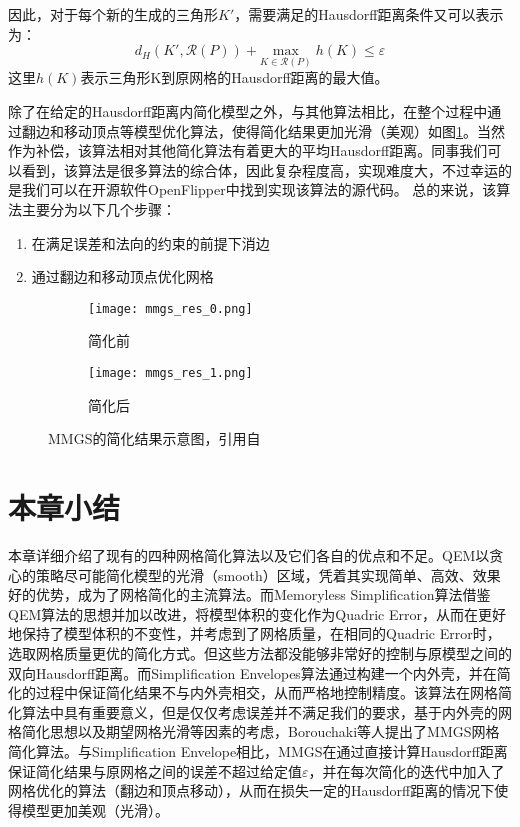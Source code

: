 因此，对于每个新的生成的三角形$K'$，需要满足的Hausdorff距离条件又可以表示为：
\begin{equation}
  d_H(K',\mathcal{R}(P))+\underset{K\in\mathcal{R}(P)}{\text{max}}\;h(K) \le \varepsilon
\end{equation}
这里$h(K)$表示三角形K到原网格的Hausdorff距离的最大值。\par
除了在给定的Hausdorff距离内简化模型之外，与其他算法相比，在整个过程中通过翻边和移动顶点等模型优化算法，使得简化结果更加光滑（美观）如图\ref{fig:mmgs-res}。当然作为补偿，该算法相对其他简化算法有着更大的平均Hausdorff距离。同事我们可以看到，该算法是很多算法的综合体，因此复杂程度高，实现难度大，不过幸运的是我们可以在开源软件OpenFlipper中找到实现该算法的源代码。
总的来说，该算法主要分为以下几个步骤：
\begin{enumerate}[（1）]
  \item 在满足误差和法向的约束的前提下消边
  \item 通过翻边和移动顶点优化网格
\end{enumerate}
\begin{figure}[htbp]
  \centering
  \begin{subfigure}[b]{0.4\textwidth}
    \texttt{[image: mmgs\_res\_0.png]}
    \caption[input]{简化前}
    \end{subfigure}
    \begin{subfigure}[b]{0.4\textwidth}
      \texttt{[image: mmgs\_res\_1.png]}
      \caption[mls]{简化后}
    \end{subfigure}
    \caption[Result]{MMGS的简化结果示意图，引用自\cite{mmgs}}
    \label{fig:mmgs-res}
\end{figure}

\section{本章小结}
本章详细介绍了现有的四种网格简化算法以及它们各自的优点和不足。QEM\cite{qem1}\cite{qem2}以贪心的策略尽可能简化模型的光滑（smooth）区域，凭着其实现简单、高效、效果好的优势，成为了网格简化的主流算法。而Memoryless Simplification算法\cite{memory-less}借鉴QEM算法的思想并加以改进，将模型体积的变化作为Quadric Error，从而在更好地保持了模型体积的不变性，并考虑到了网格质量，在相同的Quadric Error时，选取网格质量更优的简化方式。但这些方法都没能够非常好的控制与原模型之间的双向Hausdorff距离。而Simplification Envelopes算法\cite{simp-envlop}通过构建一个内外壳，并在简化的过程中保证简化结果不与内外壳相交，从而严格地控制精度。该算法在网格简化算法中具有重要意义，但是仅仅考虑误差并不满足我们的要求，基于内外壳的网格简化思想以及期望网格光滑等因素的考虑，Borouchaki等人提出了MMGS网格简化算法\cite{mmgs}。与Simplification Envelope相比，MMGS在通过直接计算Hausdorff距离保证简化结果与原网格之间的误差不超过给定值$\varepsilon$，并在每次简化的迭代中加入了网格优化的算法（翻边和顶点移动），从而在损失一定的Hausdorff距离的情况下使得模型更加美观（光滑）。
